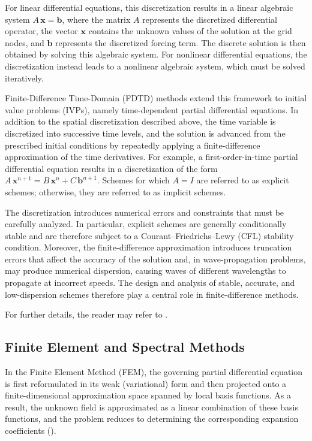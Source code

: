 \documentclass{Configuration_Files/PoliMi3i_thesis}
\begin{document}
For linear differential equations, this discretization results in a linear algebraic system $A \, \mathbf{x}=\mathbf{b}$, where the matrix $A$ represents the discretized differential operator, the vector $\mathbf{x}$ contains the unknown values of the solution at the grid nodes, and $\mathbf{b}$ represents the discretized forcing term. The discrete solution is then obtained by solving this algebraic system. For nonlinear differential equations, the discretization instead leads to a nonlinear algebraic system, which must be solved iteratively.

Finite-Difference Time-Domain (FDTD) methods extend this framework to initial value problems (IVPs), namely time-dependent partial differential equations. In addition to the spatial discretization described above, the time variable is discretized into successive time levels, and the solution is advanced from the prescribed initial conditions by repeatedly applying a finite-difference approximation of the time derivatives. For example, a first-order-in-time partial differential equation results in a discretization of the form $A \, \mathbf{x}^{n+1} = B \, \mathbf{x}^n + C \, \mathbf{b}^{n+1}$. Schemes for which $A = I$ are referred to as explicit schemes; otherwise, they are referred to as implicit schemes.

The discretization introduces numerical errors and constraints that must be carefully analyzed. In particular, explicit schemes are generally conditionally stable and are therefore subject to a Courant--Friedrichs--Lewy (CFL) stability condition. Moreover, the finite-difference approximation introduces truncation errors that affect the accuracy of the solution and, in wave-propagation problems, may produce numerical dispersion, causing waves of different wavelengths to propagate at incorrect speeds. The design and analysis of stable, accurate, and low-dispersion schemes therefore play a central role in finite-difference methods.

For further details, the reader may refer to \cite{bilbao_numerical_2009,bergman_computational_2018}.
%
\subsection{Finite Element and Spectral Methods}
In the Finite Element Method (FEM), the governing partial differential equation is first reformulated in its weak (variational) form and then projected onto a finite-dimensional approximation space spanned by local basis functions. As a result, the unknown field is approximated as a linear combination of these basis functions, and the problem reduces to determining the corresponding expansion coefficients (\cite{bergman_computational_2018}).
\end{document}
